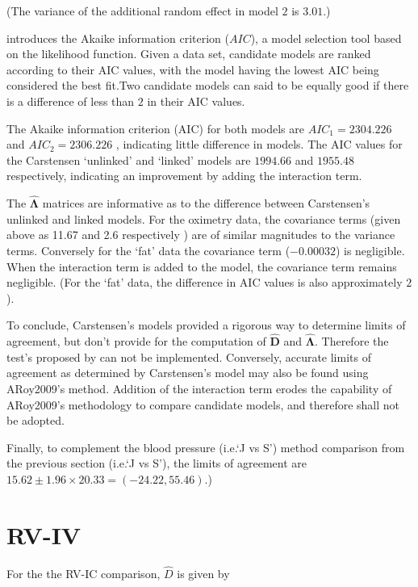 \documentclass[12pt, a4paper]{report}
\theoremstyle{plain}
\theoremstyle{definition}
\theoremstyle{remark}
\begin{document}
	\noindent (The variance of the additional random effect in model $2$ is $3.01$.)
	
	\citet{akaike} introduces the Akaike information criterion ($AIC$), a model
	selection tool based on the likelihood function. Given a data set, candidate models
	are ranked according to their AIC values, with the model having the lowest AIC being considered the best fit.Two candidate models can said to be equally good if there is a difference of less than $2$ in their AIC values.
	
	The Akaike information criterion (AIC) for both models are $AIC_{1} = 2304.226$ and $AIC_{2} = 2306.226$ , indicating little difference in models. The AIC values for the Carstensen `unlinked' and `linked' models are $1994.66$ and $1955.48$ respectively, indicating an improvement by adding the interaction term.
	
	The $\boldsymbol{\hat{\Lambda}}$ matrices are informative as to the difference between Carstensen's unlinked and linked models. For the oximetry data, the covariance terms (given above as 11.67 and 2.6 respectively ) are of similar magnitudes to the variance terms. Conversely for the `fat' data the covariance term ($-0.00032$) is negligible. When the interaction term is added to the model, the covariance term remains negligible. (For the `fat' data, the difference in AIC values is also approximately $2$).
	
	To conclude, Carstensen's models provided a rigorous way to determine limits of agreement, but don't provide for the computation of $\boldsymbol{\hat{D}}$ and $\boldsymbol{\hat{\Lambda}}$. Therefore the test's proposed by \citet{ARoy2009} can not be implemented. Conversely, accurate limits of agreement as determined by Carstensen's model may also be found using ARoy2009's method. Addition of the interaction term erodes the capability of ARoy2009's methodology to compare candidate models, and therefore shall not be adopted.
	
	Finally, to complement the blood pressure (i.e.`J vs S') method comparison from the previous section (i.e.`J vs S'), the limits of agreement are $15.62 \pm 1.96 \times 20.33 = (-24.22, 55.46)$.)
	
	
	
	
	
	
	
	
	
	\section{RV-IV}
	For the the RV-IC comparison, $\hat{D}$ is given by
	
\end{document}
